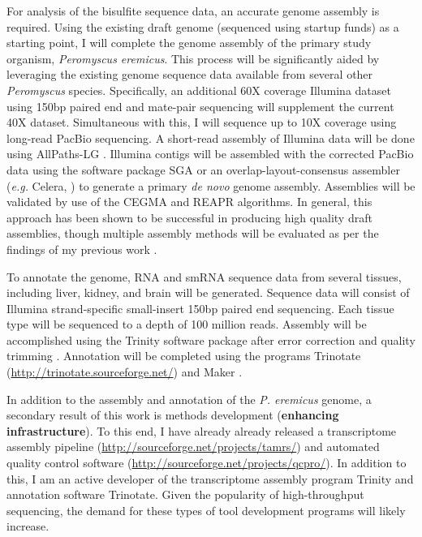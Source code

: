 \documentclass[11pt]{article}
\begin{document}
For analysis of the bisulfite sequence data, an accurate genome assembly is required. Using the existing draft genome (sequenced using startup funds) as a starting point, I will complete the genome assembly of the primary study organism, \textit{Peromyscus eremicus}. This process will be significantly aided by leveraging the existing genome sequence data available from several other \textit{Peromyscus} species. Specifically, an additional 60X coverage Illumina dataset using 150bp paired end and mate-pair sequencing will supplement the current 40X dataset. Simultaneous with this, I will sequence up to 10X coverage using long-read PacBio sequencing. A short-read assembly of Illumina data will be done using AllPaths-LG \citep{Maccallum:2009du}.  Illumina contigs will be assembled with the corrected PacBio data using the software package SGA \citep{Simpson:2012ef} or an overlap-layout-consensus assembler (\textit{e.g.} Celera, \cite{Miller:2008jx}) to generate a primary \textit{de novo} genome assembly. Assemblies will be validated by use of the CEGMA \citep{Parra:2007df} and REAPR \citep{Hunt:2013hj} algorithms. In general, this approach has been shown to be successful in producing high quality draft assemblies, though multiple assembly methods will be evaluated as per the findings of my previous work \citep{Bradnam:2013gx}.

To annotate the genome, RNA and smRNA sequence data from several tissues, including liver, kidney, and brain will be generated. Sequence data will consist of Illumina strand-specific small-insert 150bp paired end sequencing. Each tissue type will be sequenced to a depth of 100 million reads.  Assembly will be accomplished using the Trinity software package \citep{Haas:2013jq,Grabherr:2011jb} after error correction \citep{MacManes:2013ec} and quality trimming \citep{MacManes:2013ex}. Annotation will be completed using the programs Trinotate (\url{http://trinotate.sourceforge.net/}) and Maker \citep{Cantarel:2008jo}. 

In addition to the assembly and annotation of the \textit{P. eremicus} genome, a secondary result of this work is methods development (\textbf{enhancing infrastructure}). To this end, I have already already released a transcriptome assembly pipeline (\url{http://sourceforge.net/projects/tamrs/}) and automated quality control software (\url{http://sourceforge.net/projects/qcpro/}). In addition to this, I am an active developer of the transcriptome assembly program Trinity and annotation software Trinotate. Given the popularity of high-throughput sequencing, the demand for these types of tool development programs will likely increase. \\
\end{document}
